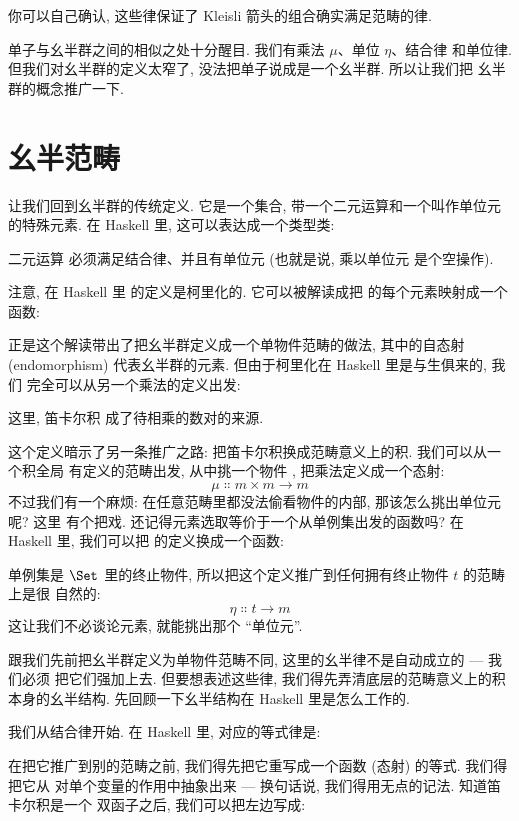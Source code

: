 \noindent
你可以自己确认, 这些律保证了 Kleisli 箭头的组合确实满足范畴的律.

单子与幺半群之间的相似之处十分醒目. 我们有乘法 $\mu$、单位 $\eta$、结合律
和单位律. 但我们对幺半群的定义太窄了, 没法把单子说成是一个幺半群. 所以让我们把
幺半群的概念推广一下.

\section{幺半范畴}

让我们回到幺半群的传统定义. 它是一个集合, 带一个二元运算和一个叫作单位元的特殊元素.
在 Haskell 里, 这可以表达成一个类型类:

二元运算  必须满足结合律、并且有单位元 (也就是说, 乘以单位元
 是个空操作).

注意, 在 Haskell 里  的定义是柯里化的. 它可以被解读成把 
的每个元素映射成一个函数:

正是这个解读带出了把幺半群定义成一个单物件范畴的做法, 其中的自态射 (endomorphism)
 代表幺半群的元素. 但由于柯里化在 Haskell 里是与生俱来的, 我们
完全可以从另一个乘法的定义出发:

这里, 笛卡尔积  成了待相乘的数对的来源.

这个定义暗示了另一条推广之路: 把笛卡尔积换成范畴意义上的积. 我们可以从一个积全局
有定义的范畴出发, 从中挑一个物件 , 把乘法定义成一个态射:
\[\mu \Colon m\times{}m \to m\]
不过我们有一个麻烦: 在任意范畴里都没法偷看物件的内部, 那该怎么挑出单位元呢? 这里
有个把戏. 还记得元素选取等价于一个从单例集出发的函数吗? 在 Haskell 里, 我们可以把
 的定义换成一个函数:

单例集是 $\Set$ 里的终止物件, 所以把这个定义推广到任何拥有终止物件 $t$ 的范畴上是很
自然的:
\[\eta \Colon t \to m\]
这让我们不必谈论元素, 就能挑出那个 ``单位元''.

跟我们先前把幺半群定义为单物件范畴不同, 这里的幺半律不是自动成立的 --- 我们必须
把它们强加上去. 但要想表述这些律, 我们得先弄清底层的范畴意义上的积本身的幺半结构.
先回顾一下幺半结构在 Haskell 里是怎么工作的.

我们从结合律开始. 在 Haskell 里, 对应的等式律是:

在把它推广到别的范畴之前, 我们得先把它重写成一个函数 (态射) 的等式. 我们得把它从
对单个变量的作用中抽象出来 --- 换句话说, 我们得用无点的记法. 知道笛卡尔积是一个
双函子之后, 我们可以把左边写成:

